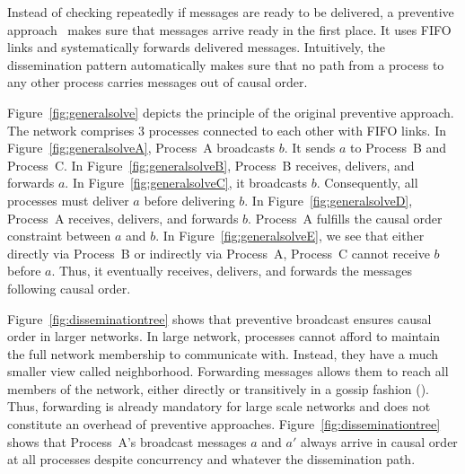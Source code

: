Instead of checking repeatedly if messages are ready to be delivered, a
preventive approach~\cite{friedman2004causal} makes sure that messages arrive
ready in the first place.  It uses FIFO links and systematically forwards
delivered messages.  Intuitively, the dissemination pattern automatically makes
sure that no path from a process to any other process carries messages out of
causal order.

Figure~\ref{fig:generalsolve} depicts the principle of the original preventive
approach. The network comprises 3 processes connected to each other with FIFO
links.  In Figure~\ref{fig:generalsolveA}, Process~A broadcasts $b$. It sends
$a$ to Process~B and Process~C. In Figure~\ref{fig:generalsolveB}, Process~B
receives, delivers, and forwards $a$. In Figure~\ref{fig:generalsolveC}, it
broadcasts $b$. Consequently, all processes must deliver $a$ before delivering
$b$. In Figure~\ref{fig:generalsolveD}, Process~A receives, delivers, and
forwards $b$. Process~A fulfills the causal order constraint between $a$ and
$b$. In Figure~\ref{fig:generalsolveE}, we see that either directly via
Process~B or indirectly via Process~A, Process~C cannot receive $b$ before
$a$. Thus, it eventually receives, delivers, and forwards the messages following
causal order.

Figure~\ref{fig:disseminationtree} shows that preventive broadcast ensures
causal order in larger networks. In large network, processes cannot afford to
maintain the full network membership to communicate with. Instead, they have a
much smaller view called neighborhood. Forwarding messages allows them to reach
all members of the network, either directly or transitively in a gossip fashion
(\REF). Thus, forwarding is already mandatory for large scale networks and does
not constitute an overhead of preventive approaches.
Figure~\ref{fig:disseminationtree} shows that Process~A's broadcast messages $a$
and $a'$ always arrive in causal order at all processes despite concurrency and
whatever the dissemination path.




